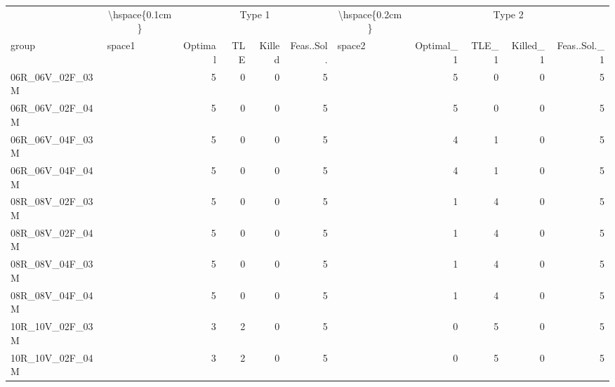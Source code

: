 
\begin{tabular}{llrrrrlrrrr}
\toprule
\multicolumn{1}{c}{} & \multicolumn{1}{c}{\textbackslash{}hspace\{0.1cm\}} & \multicolumn{4}{c}{Type 1} & \multicolumn{1}{c}{\textbackslash{}hspace\{0.2cm\}} & \multicolumn{4}{c}{Type 2} \\
\cmidrule(l{3pt}r{3pt}){2-2} \cmidrule(l{3pt}r{3pt}){3-6} \cmidrule(l{3pt}r{3pt}){7-7} \cmidrule(l{3pt}r{3pt}){8-11}
group & space1 & Optimal & TLE & Killed & Feas..Sol. & space2 & Optimal\_1 & TLE\_1 & Killed\_1 & Feas..Sol.\_1\\
\midrule
06R\_06V\_02F\_03M & \hspace{0.1cm} & 5 & 0 & 0 & 5 & \hspace{0.2cm} & 5 & 0 & 0 & 5\\
06R\_06V\_02F\_04M & \hspace{0.1cm} & 5 & 0 & 0 & 5 & \hspace{0.2cm} & 5 & 0 & 0 & 5\\
06R\_06V\_04F\_03M & \hspace{0.1cm} & 5 & 0 & 0 & 5 & \hspace{0.2cm} & 4 & 1 & 0 & 5\\
06R\_06V\_04F\_04M & \hspace{0.1cm} & 5 & 0 & 0 & 5 & \hspace{0.2cm} & 4 & 1 & 0 & 5\\
\addlinespace
08R\_08V\_02F\_03M & \hspace{0.1cm} & 5 & 0 & 0 & 5 & \hspace{0.2cm} & 1 & 4 & 0 & 5\\
08R\_08V\_02F\_04M & \hspace{0.1cm} & 5 & 0 & 0 & 5 & \hspace{0.2cm} & 1 & 4 & 0 & 5\\
08R\_08V\_04F\_03M & \hspace{0.1cm} & 5 & 0 & 0 & 5 & \hspace{0.2cm} & 1 & 4 & 0 & 5\\
08R\_08V\_04F\_04M & \hspace{0.1cm} & 5 & 0 & 0 & 5 & \hspace{0.2cm} & 1 & 4 & 0 & 5\\
\addlinespace
10R\_10V\_02F\_03M & \hspace{0.1cm} & 3 & 2 & 0 & 5 & \hspace{0.2cm} & 0 & 5 & 0 & 5\\
10R\_10V\_02F\_04M & \hspace{0.1cm} & 3 & 2 & 0 & 5 & \hspace{0.2cm} & 0 & 5 & 0 & 5\\

\end{tabular}
